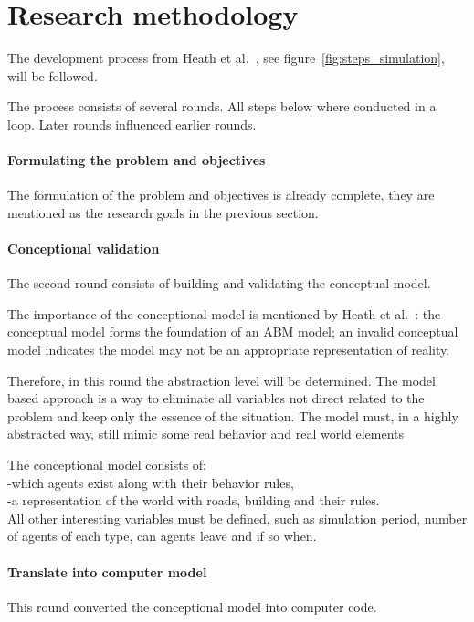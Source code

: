 \section{Research methodology}
The development process from Heath et al.~\cite{heath2009survey}, see figure~\ref{fig:steps_simulation},  will be followed.

The process consists of several rounds.
All steps below where conducted in a loop.
Later rounds influenced earlier rounds.

\paragraph{Formulating the problem and objectives}
The formulation of the problem and objectives is already complete, they are mentioned as the research goals in the previous section.

\paragraph{Conceptional validation}
The second round consists of building and validating the conceptual model.

The importance of the conceptional model is mentioned by Heath et al.~\cite{heath2009survey}: the conceptual model forms the foundation of an ABM model; an invalid conceptual model indicates the model may not be an appropriate representation of reality.

Therefore, in this round the abstraction level will be determined.
The model based approach is a way to eliminate all variables not direct related to the problem and keep only the essence of the situation.
The model must, in a highly abstracted way, still mimic some real behavior and real world elements

The conceptional model consists of:\\
-which agents exist along with their behavior rules,\\
-a representation of the world with roads, building and their rules.\\

All other interesting variables must be defined, such as simulation period, number of agents of each type, can agents leave and if so when.

\paragraph{Translate into computer model}
This round converted the conceptional model into computer code.

